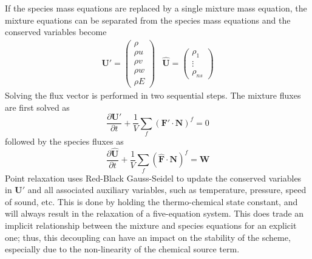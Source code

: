 If the species mass equations are replaced by a single mixture mass equation,
the mixture equations can be separated from the species mass
equations and the conserved variables become
\begin{equation}
	\begin{matrix}
		\mathbf{U}'=\begin{pmatrix}
			\rho \\
			\rho u \\
			\rho v \\
			\rho w \\
			\rho E
		\end{pmatrix} &
		\mathbf{\hat{U}}=\begin{pmatrix}
			\rho_1 \\
			\vdots \\
			\rho_{ns}
		\end{pmatrix}
	\end{matrix}
  \label{dc-variables}
\end{equation}
Solving the flux vector is performed in two sequential steps.  The mixture
fluxes are first solved as
\begin{equation}
  \frac{\partial \mathbf{{U}'}}{\partial t} +
  \frac{1}{V}\sum\limits_{f}(\mathbf{F}'\cdot\mathbf{N})^f = 0
\end{equation}
followed by the species fluxes as
\begin{equation}
  \frac{\partial \mathbf{\hat{U}}}{\partial t} +
  \frac{1}{V}\sum\limits_{f}(\mathbf{\hat{F}}\cdot\mathbf{N})^f =
  \mathbf{\hat{W}}
\end{equation}
Point relaxation uses Red-Black Gauss-Seidel to update the conserved
variables in $\mathbf{U}'$ and all associated auxiliary variables, such as
temperature, pressure, speed of sound, etc.  This is done by holding the
thermo-chemical state constant, and will always result in the relaxation of a
five-equation system.  This does trade an implicit relationship between the mixture
and species equations for an explicit one; thus, this decoupling can have an
impact on the stability of the scheme, especially due to the non-linearity of
the chemical source term\cite{park}.
 
